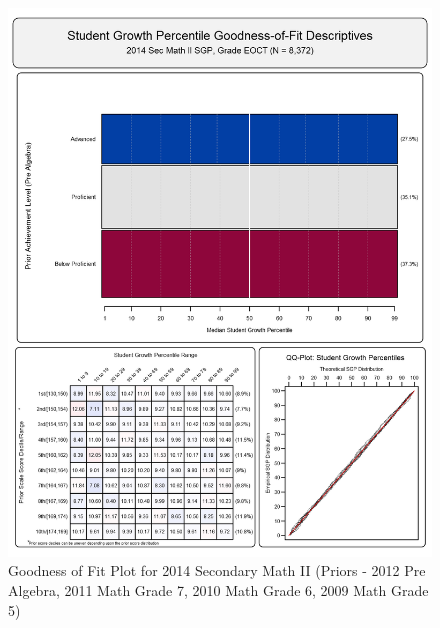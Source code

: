 \documentclass[12pt]{article}
\begin{document}
\begin{figure}[htbp]
\centering
\includegraphics{../img/Goodness_of_Fit/SEC_MATH_II.2014/2014_SEC_MATH_II_EOCT;2012_PRE_ALGEBRA_EOCT;2011_MATH_7;2010_MATH_6;2009_MATH_5.png}
\caption{Goodness of Fit Plot for 2014 Secondary Math II (Priors - 2012
Pre Algebra, 2011 Math Grade 7, 2010 Math Grade 6, 2009 Math Grade 5)}
\end{figure}
\end{document}
